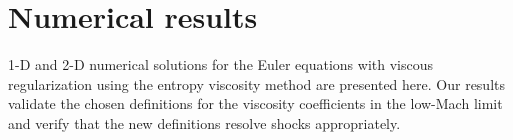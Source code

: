 \section{Numerical results} \label{sec:results}

1-D and 2-D numerical solutions for the Euler equations with viscous regularization using the entropy viscosity method are presented here.
Our results validate the chosen definitions for the viscosity coefficients in the low-Mach limit and verify that the new definitions resolve shocks appropriately. 

